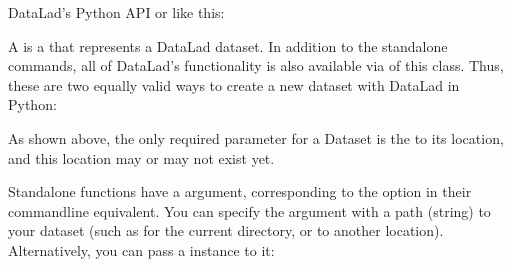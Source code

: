 \begin{findoutmore}[label={fom-pythonapi}, before title={\thetcbcounter\ }, float, check odd page=true]{DataLad’s Python API}
\sphinxAtStartPar
or like this:

\begin{sphinxVerbatim}[commandchars=\\\{\}]
   
\end{sphinxVerbatim}

\sphinxAtStartPar
A  is a 
that represents a DataLad dataset. In addition to the
stand\sphinxhyphen{}alone commands, all of DataLad’s functionality is also available via
of this class. Thus, these are two equally valid ways to create a new
dataset with DataLad in Python:

\begin{sphinxVerbatim}[commandchars=\\\{\}]
    
  
\end{sphinxVerbatim}

\sphinxAtStartPar
As shown above, the only required parameter for a Dataset is the  to
its location, and this location may or may not exist yet.

\sphinxAtStartPar
Stand\sphinxhyphen{}alone functions have a  argument, corresponding to the
 option in their command\sphinxhyphen{}line equivalent. You can specify
the  argument with a path (string) to your dataset (such as
 for the current directory, or  to
another location). Alternatively, you can pass a  instance to it:


\end{findoutmore}
